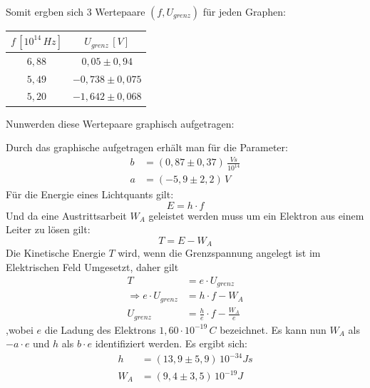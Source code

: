Somit ergben sich 3 Wertepaare \((f, U_{grenz})\) für jeden Graphen:
\begin{center}
\begin{tabular}{c|c}
\(f\, [10^{14}\, Hz]\) & \(U_{grenz}\, [V]\) \\\hline
\(6,88\) & \(0,05 \pm 0,94\) \\
\(5,49\) & \(-0,738 \pm 0,075\) \\
\(5,20\) & \(-1,642 \pm 0,068\) \\
\end{tabular}
\end{center}
Nunwerden diese Wertepaare graphisch aufgetragen:
\begin{center}
\begin{minipage}{\linewidth}
\centering
{}
\end{minipage}
\end{center}
Durch das graphische aufgetragen erhält man für die Parameter:
\begin{align}
b &= (0,87 \pm 0,37)\, \frac{V s}{10^{14}}\\
a &= (-5,9 \pm 2,2)\, V
\end{align}
Für die Energie eines Lichtquants gilt:
\begin{equation}
E = h \cdot f
\end{equation}
Und da eine Austrittsarbeit \(W_A\) geleistet werden muss um ein Elektron aus einem Leiter zu lösen gilt:
\begin{equation}
T = E - W_A
\end{equation}
Die Kinetische Energie \(T\) wird, wenn die Grenzspannung angelegt ist im Elektrischen Feld Umgesetzt, daher gilt
\begin{align}
T &= e \cdot U_{grenz}\\
\Rightarrow e \cdot U_{grenz} &= h \cdot f - W_A \\
U_{grenz} &= \frac{h}{e} \cdot f - \frac{W_A}{e} 
\end{align}
,wobei \(e\) die Ladung des Elektrons \(1,60 \cdot 10^{-19} \, C\) bezeichnet.
Es kann nun \(W_A\) als \(-a\cdot e\) und \(h\) als \(b\cdot e\) identifiziert werden.
Es ergibt sich:
\begin{align}
h &= (13,9 \pm 5,9)\, 10^{-34} Js \\
W_A &= (9,4 \pm 3,5)\, 10^{-19} J
\end{align}
